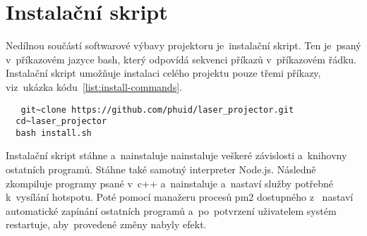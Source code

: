 





\section{Instalační skript}
Nedílnou součástí softwarové výbavy projektoru je~instalační skript.
Ten je~psaný v~příkazovém jazyce bash, který odpovídá sekvenci příkazů v~příkazovém řádku.
Instalační skript umožňuje instalaci celého projektu pouze třemi příkazy, viz~ukázka kódu~\ref{list:install-commands}.

\begin{code}
\begin{verbatim}
   git~clone https://github.com/phuid/laser_projector.git
  cd~laser_projector
  bash install.sh
\end{verbatim}
\end{code}

Instalační skript stáhne a~nainstaluje nainstaluje veškeré závislosti a~knihovny ostatních programů. Stáhne také samotný interpreter Node.js.
Následně zkompiluje programy psané v~c++ a~nainstaluje a~nastaví služby potřebné k~vysílání hotspotu. Poté pomocí manažeru procesů pm2 dostupného z~\cite{pm2} nastaví automatické zapínání ostatních programů a~po~potvrzení uživatelem systém restartuje, aby~provedené změny nabyly efekt.
